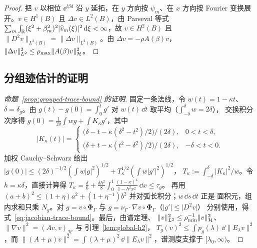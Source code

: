 \begin{proof}
  把 $v$ 以相位 $\ee^{\ii\beta d}$ 沿 $y$ 延拓，在 $y$ 方向按 $\psi_m$、在 $x$ 方向按
  Fourier 变换展开。$v\in H^1(B)$ 且 $\Delta v\in L^2(B)$，由 Parseval 等式
  $\sum_m\int_{\mathbb{R}}(\xi^2+\beta_m^2)^2|\widehat v_m(\xi)|^2\,\mathrm{d}\xi<\infty$，故 $v\in H^2(B)$
  且 $\lVert D^2v\rVert_{L^2(B)}=\lVert\Delta v\rVert_{L^2(B)}$。由 $\Delta v=-\rho A(\beta)v$，
  $\lVert\Delta v\rVert_{L^2}^2\leq\rho_{\max}\lVert A(\beta)v\rVert_{\mathcal H}^2$。
\end{proof}

\subsection{分组迹估计的证明}
\label{app:trace-proof}

\begin{proof}[命题~\ref{prop:grouped-trace-bound} 的证明]
  固定一条法线，令 $w(t)=1-\kappa t$、$\delta=\delta_g$。由
  $g(t)-g(0)=\int_0^tg'$ 对 $w(t)\,\dd t$ 取平均（$\int_{-\delta}^{\delta}w=2\delta$），
  交换积分次序得 $g(0)=\frac1{2\delta}\int w g+\int K_\kappa g'$，其中
  \[
    \lvert K_\kappa(t)\rvert=
    \begin{cases}
      \bigl(\delta-t-\kappa(\delta^2-t^2)/2\bigr)/(2\delta),&0<t<\delta,\\
      \bigl(\delta+t-\kappa(t^2-\delta^2)/2\bigr)/(2\delta),&-\delta<t<0.
    \end{cases}
  \]
  加权 Cauchy--Schwarz 给出
  $\lvert g(0)\rvert\leq(2\delta)^{-1/2}(\int w\lvert g\rvert^2)^{1/2}
  +T_\kappa^{1/2}(\int w\lvert g'\rvert^2)^{1/2}$，
  $T_\kappa:=\int_{-\delta}^{\delta}\lvert K_\kappa\rvert^2/w$。令 $h=\kappa\delta$，直接计算得
  $T_\kappa=\frac\delta6+\frac{\delta h^2}{8}\int_0^1\frac{(1-x)^4}{1-h^2x^2}\,\dd x\leq\tau_g$。
  再用 $(a+b)^2\leq(1+\eta)a^2+(1+\eta^{-1})b^2$ 并对弧长积分；$w\,\dd s\,\dd t$ 正是
  面积元，组内求和只乘 $N_g$。对 $g=v\circ\boldsymbol\Phi_\Gamma$ 与
  $g=\nu_\Gamma\cdot\nabla v\circ\boldsymbol\Phi_\Gamma$（$\lvert g'\rvert\leq\lvert D^2v\rvert$）
  分别使用，得式~\eqref{eq:jacobian-trace-bound}。最后，由谱定理、
  $\lVert v\rVert_{L^2}^2\leq\rho_{\min}^{-1}\lVert v\rVert_{\mathcal H}^2$、
  $\lVert\nabla v\rVert^2=(A v,v)_{\mathcal H}$ 与
  引理~\ref{lem:global-h2}，
  $T_g(v)^2\leq\int p_g(\lambda)\,\dd\lVert E_\lambda v\rVert^2$，而
  $\lVert(A+\mu)v\rVert^2=\int(\lambda+\mu)^2\,\dd\lVert E_\lambda v\rVert^2$，谱测度支撑于
  $[\lambda_0,\infty)$。
\end{proof}

